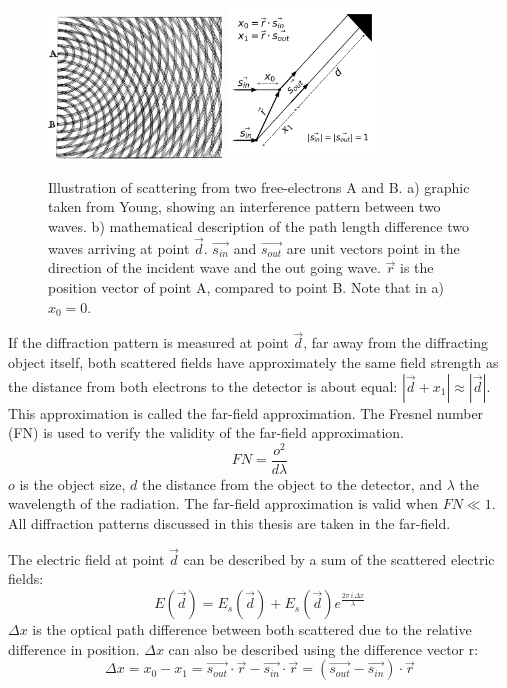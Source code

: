 \begin{figure}[h]\label{fig:Interference}
\centering 
\includegraphics[width=46mm]{Young_Diffraction2.png}
\includegraphics[width=40mm]{blah.png}

\caption{Illustration of scattering from two free-electrons A and B. a) graphic taken from Young, showing an interference pattern between two waves. b) mathematical description of the path length difference two waves arriving at point $\vec{d}$. $\vec{s_{in}}$ and $\vec{s_{out}}$ are unit vectors point in the direction of the incident wave and the out going wave. $\vec{r}$ is the position vector of point A, compared to point B. Note that in a) $x_0 = 0$.}
\end{figure}

If the diffraction pattern is measured at point \(\vec{d}\), far away from the diffracting object itself, both scattered fields have approximately the same field strength as the distance from both electrons to the detector is about equal: $|\vec{d}+x_1| \approx |\vec{d}|$. This approximation is called the far-field approximation. The Fresnel number (FN) is used to verify the validity of the far-field approximation.
\begin{equation} 
FN = \frac{o^2}{d\lambda}
\end{equation}
$o$ is the object size, $d$ the distance from the
object to the detector, and \(\lambda\) the
wavelength of the radiation. The far-field approximation is valid when $FN \ll 1$. All diffraction patterns discussed
in this thesis are taken in the far-field. 

The electric field at point $\vec{d}$ can be described by a sum of the scattered electric fields:
\begin{equation}
E(\vec{d}) = E_s(\vec{d})+E_s(\vec{d}) e^{\frac{2 \pi\,i\,\Delta x}{\lambda}} 	 
\end{equation}
$\Delta x$ is the optical path difference between both scattered due to the relative difference in position. $\Delta x$ can also be described using the difference vector r: 
\begin{equation}
\Delta x = x_0 - x_1 =\vec{s_{out}} \cdot \vec{r}-\vec{ s_{in}}\cdot \vec{r} = (\vec{s_{out}} -\vec{s_{in}} ) \cdot \vec{r} 
\end{equation}

